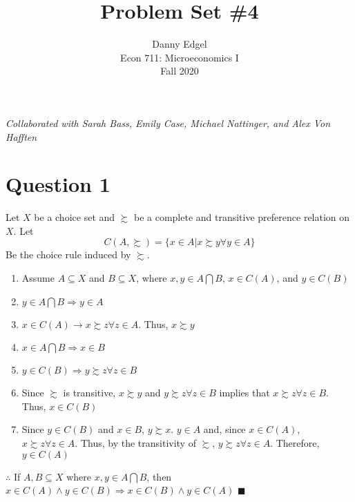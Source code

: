 \documentclass{article}
\newcommand{\intersect}{\bigcap}
\begin{document}
\title{	Problem Set \#4 }
\author{ 	Danny Edgel 					\\ 
			Econ 711: Microeconomics I		\\
			Fall 2020						\\
		}
\maketitle\thispagestyle{empty}

\noindent\textit{Collaborated with Sarah Bass, Emily Case, Michael Nattinger, and Alex Von Hafften}


\section*{Question 1}
Let $X$ be a choice set and $\succsim$ be a complete and transitive preference relation on $X$. Let 
\[
	C(A,\succsim) = \{x\in A | x\succsim y \forall y\in A\}
\]
Be the choice rule induced by $\succsim$.
\begin{enumerate}
	\item Assume $A\subseteq X$ and $B \subseteq X$, where $x,y\in A\intersect B$, $x\in C(A)$, and $y\in C(B)$
	
	\item $y\in A\intersect B\Rightarrow y\in A$
	
	\item $x\in C(A) \rightarrow x\succsim z \forall z\in A$. Thus, $x\succsim y$ 
	
	\item $x \in A\intersect B\Rightarrow x\in B$ 
	
	\item $y\in C(B)\Rightarrow y\succsim z \forall z\in B$
	
	\item Since $\succsim$ is transitive, $x\succsim y$ and $y\succsim z\forall z \in B$ implies that $x\succsim z\forall z \in B$. Thus, $x\in C(B)$
	
	\item Since $y\in C(B)$ and $x\in B$, $y\succsim x$. $y\in A$ and, since $x\in C(A)$, $x\succsim z\forall z\in A$. Thus, by the transitivity of $\succsim$, $y\succsim z\forall z\in A$. Therefore, $y\in C(A)$
	
\end{enumerate}
$\therefore$ If $A,B\subseteq X$ where $x,y\in A\intersect B$, then $x\in C(A)\land y\in C(B)\Rightarrow x\in C(B)\land y\in C(A)$ $\blacksquare$
\end{document}
